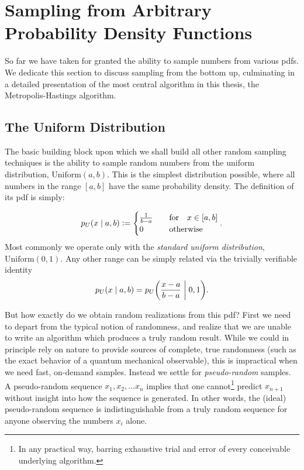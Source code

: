 \documentclass[Thesis.tex]{subfiles}
\begin{document}
\section{Sampling from Arbitrary Probability Density Functions}
\label{sec:sampling-arb-prob-dist-funcs}

So far we have taken for granted the ability to sample numbers from various
\glspl{pdf}. We dedicate this section to discuss sampling from the bottom up,
culminating in a detailed presentation of the most central algorithm in this
thesis, the Metropolis-Hastings algorithm.

\subsection{The Uniform Distribution}

The basic building block upon which we shall build all other random sampling
techniques is the ability to sample random numbers from the uniform
distribution, $\text{Uniform}(a, b)$. This is the simplest distribution
possible, where all numbers in the range $[a, b]$ have the same probability
density. The definition of its \gls{pdf} is simply:

\begin{align}\label{eq:uniform-pdf-definition}
    p_U\qty(x\;\middle|\; a, b) \defeq  \begin{cases}
        \frac{1}{b - a} &\qfor x\in [a, b]\\
        0&\qotherwise
    \end{cases}.
\end{align}
Most commonly we operate only with the \emph{standard uniform distribution}, $\text{Uniform}(0, 1)$. Any other range can be simply related via the trivially verifiable identity
\begin{align}
    p_U\qty(x\;\middle|\; a,b) = p_U\qty( \frac{x-a}{b-a} \;\middle|\; 0, 1).
\end{align}

But how exactly do we obtain random realizations from this \gls{pdf}? First we need
to depart from the typical notion of randomness, and realize that we are unable to
write an algorithm which produces a truly random result. While we could in
principle rely on nature to provide sources of complete, true randomness (such as
the exact behavior of a quantum mechanical observable), this is impractical
when we need fast, on-demand samples. Instead we settle for
\emph{pseudo-random} samples. A pseudo-random sequence $x_1, x_2,\dots x_n$
implies that one cannot\footnote{In any practical way, barring exhaustive trial
and error of every conceivable underlying algorithm.} predict $x_{n+1}$ without
insight into how the sequence is generated. In other words, the (ideal)
pseudo-random sequence is indistinguishable from a truly random sequence for
anyone observing the numbers $x_i$ alone.
\end{document}
